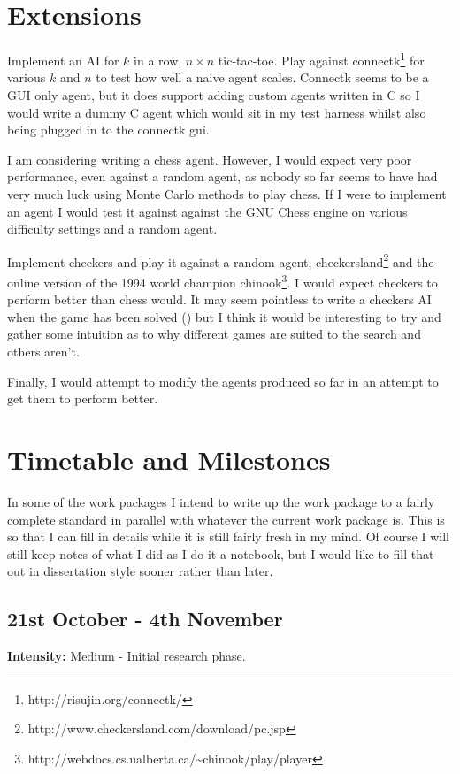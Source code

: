 \documentclass[12pt]{article}
\begin{document}
\section*{Extensions}

Implement an AI for $k$ in a row, $n\times n$ tic-tac-toe.
Play against connectk\footnote{http://risujin.org/connectk/} for various $k$ and $n$ to test how well a naive  agent scales.
Connectk seems to be a GUI only agent, but it does support adding custom agents written in C so I would write a dummy C agent which would sit in my test harness whilst also being plugged in to the connectk gui.

I am considering writing a chess agent. However, I would expect very poor performance, even against a random agent, as nobody so far seems to have had very much luck using Monte Carlo methods to play chess. If I were to implement an agent I would test it against against the GNU Chess engine on various difficulty settings and a random agent.

Implement checkers and play it against a random agent, checkersland\footnote{http://www.checkersland.com/download/pc.jsp} and the online version of the 1994 world champion chinook\footnote{http://webdocs.cs.ualberta.ca/\textasciitilde{}chinook/play/player}. I would expect checkers to perform better than chess would. It may seem pointless to write a checkers AI when the game has been solved (\cite{checkerssolved}) but I think it would be interesting to try and gather some intuition as to why different games are suited to the search and others aren't.

Finally, I would attempt to modify the agents produced so far in an attempt to get them to perform better.

\section*{Timetable and Milestones}
In some of the work packages I intend to write up the work package to a fairly complete standard in parallel with whatever the current work package is. This is so that I can fill in details while it is still fairly fresh in my mind. Of course I will still keep notes of what I did as I do it a notebook, but I would like to fill that out in dissertation style sooner rather than later.
\subsection*{21st October - 4th November}
{\bf Intensity:} Medium - Initial research phase.\par
\end{document}

